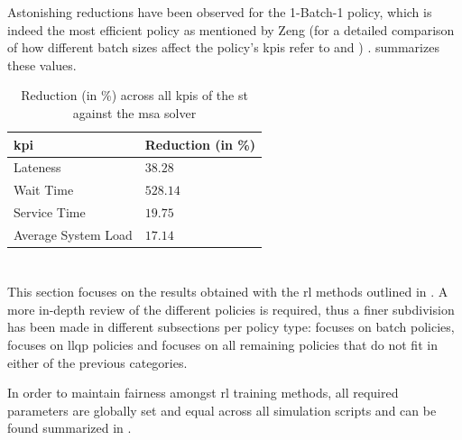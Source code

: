 \documentclass{seal_thesis}
\begin{document}

Astonishing reductions have been observed for the 1-Batch-1 policy, which is indeed the most efficient policy as mentioned by Zeng (for a detailed comparison of how different batch sizes affect the policy's \glspl{kpi} refer to  and ) \cite[p. 24]{Zeng2005}.  summarizes these values.

\begin{table}[!ht]
\centering
\begin{tabular}{@{}ll@{}}
\toprule
\gls{kpi}                 & Reduction (in \%) \\ \midrule
Lateness            & $38.28$             \\
Wait Time           & $528.14$             \\
Service Time        & $19.75$             \\
Average System Load & $17.14$             \\ \bottomrule
\end{tabular}
\caption{Reduction (in \%) across all \glspl{kpi} of the \gls{st} against the \gls{msa} solver}
\label{tab:opt_kpis_comp_gain}
\end{table}

\clearpage

\section{}
\label{sec:rl_results}

This section focuses on the results obtained with the \gls{rl} methods outlined in . A more in-depth review of the different policies is required, thus a finer subdivision has been made in different subsections per policy type:  focuses on batch policies,  focuses on \gls{llqp} policies and  focuses on all remaining policies that do not fit in either of the previous categories.

In order to maintain fairness amongst \gls{rl} training methods, all required parameters are globally set and equal across all simulation scripts and can be found summarized in .
\end{document}
